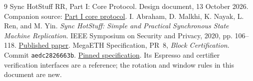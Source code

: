 \documentclass[11pt,a4paper]{article}
\newcounter{protocol}
\begin{document}
\begingroup\small
\begin{thebibliography}{9}
Sync HotStuff RR, Part I: Core Protocol. Design document, 13 October 2026.
Companion source: \href{run:sync_hotstuff_rr_part1_core.tex}{Part I core protocol}.
I. Abraham, D. Malkhi, K. Nayak, L. Ren, and M. Yin.
\emph{Sync HotStuff: Simple and Practical Synchronous State Machine Replication}.
IEEE Symposium on Security and Privacy, 2020, pp. 106--118.
\href{https://conferences.computer.org/sp/pdfs/sp/2020/349700a106.pdf}{Published paper}.
MegaETH Specification, PR~8, \emph{Block Certification}.
Commit \texttt{aedc2826663b}.
\href{https://github.com/megaeth-labs/specification/tree/aedc2826663b134ee25d26bea17e70c6d23d321c/specs/block-certification}{Pinned specification}.
Its Espresso and certifier verification interfaces are a reference;
the rotation and window rules in this document are new.
\end{thebibliography}
\endgroup
\end{document}
